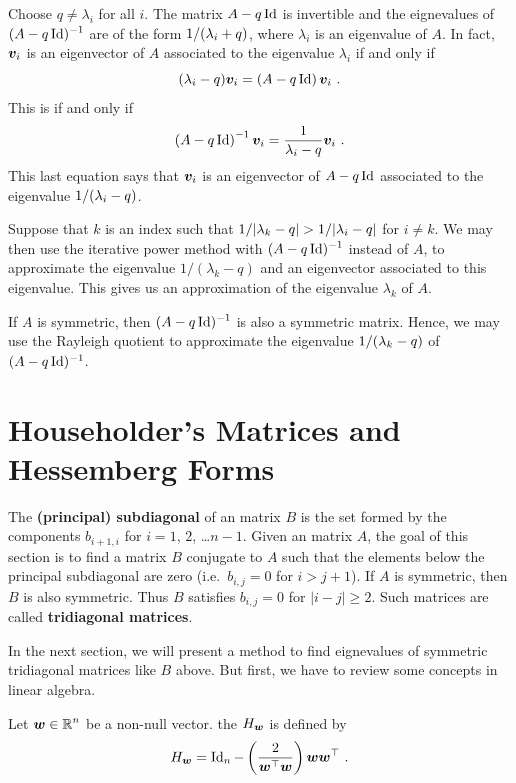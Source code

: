 Choose $q \neq \lambda_i$ for all $i$.  The matrix $A-q\operatorname{Id}$ is invertible and
the eignevalues of $\displaystyle (A-q\operatorname{Id})^{-1}$ are of the form
$\displaystyle 1/(\lambda_i + q)$, where $\lambda_i$ is an eigenvalue
of $A$.  In fact, $\bm{v}_i$ is an eigenvector of $A$ associated to the
eigenvalue $\lambda_i$ if and only if
\[
(\lambda_i-q) \bm{v}_i = \left(A-q\operatorname{Id}\right) \bm{v}_i \ .
\]
This is if and only if
\[
\left(A-q\operatorname{Id}\right)^{-1} \bm{v}_i = \frac{1}{\lambda_i-q} \bm{v}_i \ .
\]
This last equation says that $\bm{v}_i$ is an eigenvector of $A-q\operatorname{Id}$
associated to the eigenvalue $\displaystyle 1/(\lambda_i - q)$.

Suppose that $k$ is an index such that
$\displaystyle 1/|\lambda_k - q| > 1/|\lambda_i -q|$
for $i \neq k$.  We may then use the iterative power method with
$\displaystyle (A-q\operatorname{Id})^{-1}$ instead of $A$, to approximate the eigenvalue
$1/(\lambda_k - q)$ and an eigenvector associated to this eigenvalue.
This gives us an approximation of the eigenvalue $\lambda_k$ of $A$.

If $A$ is symmetric, then $\displaystyle (A-q\operatorname{Id})^{-1}$ is also a
symmetric matrix.  Hence, we may use the Rayleigh quotient to
approximate the eigenvalue
$\displaystyle 1/(\lambda_k - q)$ of $(A-q\operatorname{Id})^{-1}$.

\section{Householder's Matrices and Hessemberg Forms}

The {\bfseries (principal) subdiagonal}
of an \nn matrix $B$ is
the set formed by the components $b_{i+1,i}$ for $i=1$, $2$, \ldots $n-1$.
Given an \nn matrix $A$, the goal of this section is to find a matrix $B$
conjugate to $A$ such that the elements below the principal subdiagonal are
zero  (i.e.\ $b_{i,j}=0$ for $i>j+1$).  If $A$ is symmetric, then $B$ is also
symmetric.  Thus $B$ satisfies $b_{i,j} = 0$ for $|i-j|\geq 2$.  Such
matrices are called
{\bfseries tridiagonal matrices}.

In the next section, we will present a method to find eignevalues of
symmetric tridiagonal matrices like $B$ above.  But first, we have to
review some concepts in linear algebra.

\begin{defn}
Let $\displaystyle \bm{w} \in \mathbb{R}^n$ be a non-null vector.  the
$H_{\bm{w}}$ is defined by
\[
H_{\bm{w}} = \operatorname{Id}_n - \left(\frac{2}{\bm{w}^\top \bm{w}}\right)
\bm{w} \bm{w}^\top \ .
\]
\end{defn}

